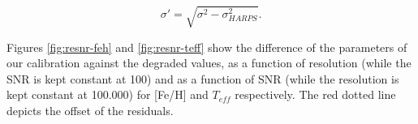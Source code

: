 \documentclass{aa}
\begin{document}


\begin{equation}
\sigma' = \sqrt{\sigma^2-\sigma_{HARPS}^2}.
\end{equation}

Figures \ref{fig:resnr-feh} and \ref{fig:resnr-teff} show the difference of the parameters of our calibration against the degraded values, as a function of resolution (while the SNR is kept constant at 100) and as a function of SNR (while the resolution is kept constant at 100.000) for [Fe/H] and $T_{eff}$ respectively. The red dotted line depicts the offset of the residuals. 



\end{document}
